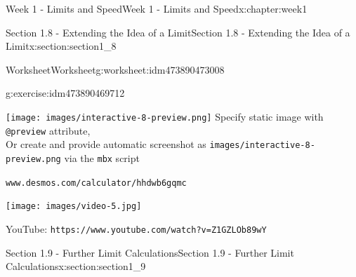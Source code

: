 \documentclass[oneside,10pt,]{book}
\newcommand{\mono}[1]{\texttt{#1}}
\numberwithin{equation}{section}
\newlength{\qrsize}
\newlength{\previewwidth}
\begin{document}
\begin{chapterptx}{Week 1 - Limits and Speed}{}{Week 1 - Limits and Speed}{}{}{x:chapter:week1}
\begin{sectionptx}{Section 1.8 - Extending the Idea of a Limit}{}{Section 1.8 - Extending the Idea of a Limit}{}{}{x:section:section1_8}
\begin{worksheet-subsection}{Worksheet}{}{Worksheet}{}{}{g:worksheet:idm473890473008}
\begin{divisionexercise}{2}{}{}{g:exercise:idm473890469712}
\setlength{\qrsize}{9em}
\setlength{\previewwidth}{\linewidth}
\addtolength{\previewwidth}{-\qrsize}
\begin{tcbraster}[raster columns=2, raster column skip=1pt, raster halign=center, raster force size=false, raster left skip=0pt, raster right skip=0pt]%
\begin{tcolorbox}[previewstyle, width=\previewwidth]%
%
{\texttt{[image: images/interactive-8-preview.png]}}%
{\small{}Specify static image with \mono{@preview} attribute,\\Or create and provide automatic screenshot as \mono{images/interactive-8-preview.png} via the \mono{mbx} script}%
\end{tcolorbox}%
\begin{tcolorbox}[qrstyle]%
{\hypersetup{urlcolor=black}}%
\end{tcolorbox}%
\begin{tcolorbox}[captionstyle]%
\small \mono{www.desmos.com/calculator/hhdwb6gqmc}\end{tcolorbox}%
\end{tcbraster}%
%
\end{divisionexercise}%
\end{worksheet-subsection}
\restoregeometry
\setlength{\qrsize}{9em}
\setlength{\previewwidth}{\linewidth}
\addtolength{\previewwidth}{-\qrsize}
\begin{tcbraster}[raster columns=2, raster column skip=1pt, raster halign=center, raster force size=false, raster left skip=0pt, raster right skip=0pt]%
\begin{tcolorbox}[previewstyle, width=\previewwidth]%
\texttt{[image: images/video-5.jpg]}%
\end{tcolorbox}%
\begin{tcolorbox}[qrstyle]%
{\hypersetup{urlcolor=black}}%
\end{tcolorbox}%
\begin{tcolorbox}[captionstyle]%
\small YouTube: \mono{https://www.youtube.com/watch?v=Z1GZLOb89wY}\end{tcolorbox}%
\end{tcbraster}%
\end{sectionptx}
%
%
\typeout{************************************************}
\typeout{************************************************}
%
\begin{sectionptx}{Section 1.9 - Further Limit Calculations}{}{Section 1.9 - Further Limit Calculations}{}{}{x:section:section1_9}

\end{sectionptx}
\end{chapterptx}
\end{document}
